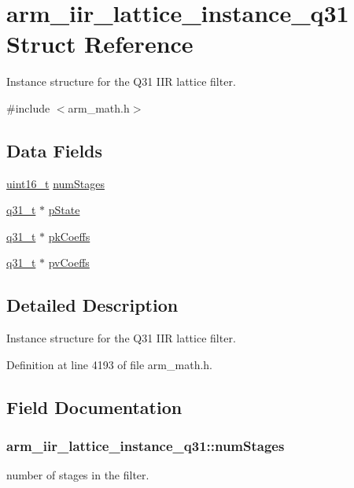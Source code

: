 \hypertarget{structarm__iir__lattice__instance__q31}{\section{arm\-\_\-iir\-\_\-lattice\-\_\-instance\-\_\-q31 Struct Reference}
\label{structarm__iir__lattice__instance__q31}
}


Instance structure for the Q31 I\-I\-R lattice filter.  




{\ttfamily \#include $<$arm\-\_\-math.\-h$>$}

\subsection*{Data Fields}
\begin{DoxyCompactItemize}
\item 
\hyperlink{stdint_8h_a273cf69d639a59973b6019625df33e30}{uint16\-\_\-t} \hyperlink{structarm__iir__lattice__instance__q31_a9df4570ed28c50fd9193ab654ff236ad}{num\-Stages}
\item 
\hyperlink{arm__math_8h_adc89a3547f5324b7b3b95adec3806bc0}{q31\-\_\-t} $\ast$ \hyperlink{structarm__iir__lattice__instance__q31_a941282745effd26a889fbfadf4b95e6a}{p\-State}
\item 
\hyperlink{arm__math_8h_adc89a3547f5324b7b3b95adec3806bc0}{q31\-\_\-t} $\ast$ \hyperlink{structarm__iir__lattice__instance__q31_a1d30aa16aac7722936ea9dee59211863}{pk\-Coeffs}
\item 
\hyperlink{arm__math_8h_adc89a3547f5324b7b3b95adec3806bc0}{q31\-\_\-t} $\ast$ \hyperlink{structarm__iir__lattice__instance__q31_a04507e2b982b1dfa97b7b55752dea6b9}{pv\-Coeffs}
\end{DoxyCompactItemize}


\subsection{Detailed Description}
Instance structure for the Q31 I\-I\-R lattice filter. 

Definition at line 4193 of file arm\-\_\-math.\-h.



\subsection{Field Documentation}
\hypertarget{structarm__iir__lattice__instance__q31_a9df4570ed28c50fd9193ab654ff236ad}{
\subsubsection[{num\-Stages}]{ arm\-\_\-iir\-\_\-lattice\-\_\-instance\-\_\-q31\-::num\-Stages}}\label{structarm__iir__lattice__instance__q31_a9df4570ed28c50fd9193ab654ff236ad}
number of stages in the filter. 

